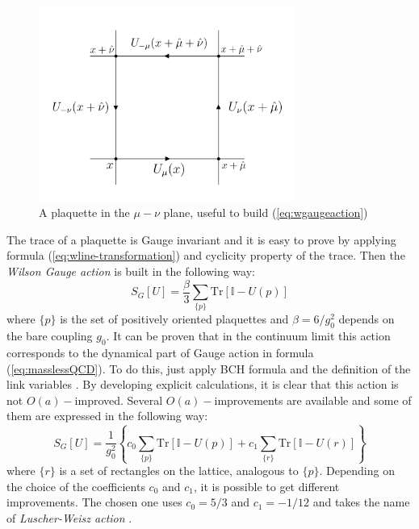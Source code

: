 \documentclass[english, LaM, oneside, noexaminfo]{sapthesis}
\newcommand{\oaid}{$O(a)-$improved}
\newcommand{\tr}{\text{Tr}}
\begin{document}
\begin{figure}[h!]
    \centering
    \includegraphics[width=0.75\textwidth]{imgs-MSc-thesis/plaquette.png}
    \caption{A plaquette in the $\mu-\nu$ plane, useful to build (\ref{eq:wgaugeaction})}
    \label{fig:plaquette}
\end{figure}
The trace of a plaquette is Gauge invariant and it is easy to prove by applying formula (\ref{eq:wline-transformation}) and cyclicity property of the trace.
Then the \textit{Wilson Gauge action} is built in the following way:
\begin{equation}\label{eq:wgaugeaction}
    S_G[U] = \frac{\beta}{3}\sum_{\{p\}} \tr \left[ \mathbb{I} - U(p)\right]
\end{equation}
where $\{p\}$ is the set of positively oriented plaquettes and $\beta = 6/g_0^2$ depends on the bare coupling $g_0$.
It can be proven that in the continuum limit this action corresponds to the dynamical part of Gauge action in formula (\ref{eq:masslessQCD}).
To do this, just apply BCH formula and the definition of the link variables \cite{gattringer-lang}.
By developing explicit calculations, it is clear that this action is not \oaid.
\newline
Several $O(a)-$improvements are available and some of them are expressed in the following way:
\begin{equation}\label{eq:gaugeaction-LuscherWeisz}
    S_G[U] = \frac{1}{g_0^2} \left\{ c_0 \sum_{\{p\}} \tr \left[ \mathbb{I} - U(p)\right] + c_1 \sum_{\{r\}} \tr \left[ \mathbb{I} - U(r)\right] \right\}
\end{equation}
where $\{r\}$ is a set of rectangles on the lattice, analogous to $\{p\}$.
Depending on the choice of the coefficients $c_{0}$ and $c_{1}$, it is possible to get different improvements.
The chosen one uses $c_0 = 5/3$ and $c_1 = -1/12$ and takes the name of \textit{Luscher-Weisz action} \cite{tmLQCD}.
\end{document}
